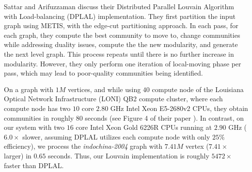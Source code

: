 
Sattar and Arifuzzaman \cite{sattar2022scalable} discuss their Distributed Parallel Louvain Algorithm with Load-balancing (DPLAL) implementation. They first partition the input graph using METIS, with the edge-cut partitioning approach. In each pass, for each graph, they compute the best community to move to, change communities while addressing duality issues, compute the the new modularity, and generate the next level graph. This process repeats until there is no further increase in modularity. However, they only perform one iteration of local-moving phase per pass, which may lead to poor-quality communities being identified. On a graph with $1M$ vertices, and while using $40$ compute node of the Louisiana Optical Network Infrastructure (LONI) QB2 compute cluster, where each compute node has two $10$ core $2.80$ GHz Intel Xeon E5-2680v2 CPUs, they obtain communities in roughly $80$ seconds (see Figure 4 of their paper \cite{sattar2022scalable}). In contrast, on our system with two $16$ core Intel Xeon Gold 6226R CPUs running at $2.90$ GHz ($6.0\times$ slower, assuming DPLAL utilizes each compute node with only $25\%$ efficiency), we process the \textit{indochina-2004} graph with $7.41M$ vertex ($7.41\times$ larger) in $0.65$ seconds. Thus, our Louvain implementation is roughly $5472\times$ faster than DPLAL.

